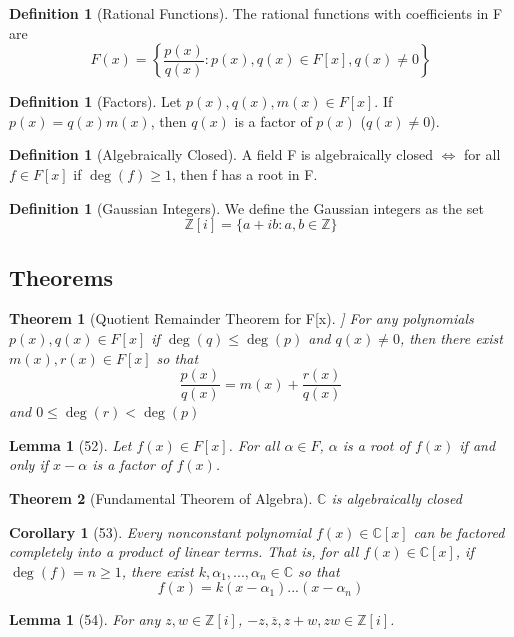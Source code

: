 \documentclass[12pt]{article}
\newtheorem*{thm*}{Theorem}
\newtheorem{lem}[thm]{Lemma}  %
\newtheorem{cor}[thm]{Corollary}
\theoremstyle{definition}
\newtheorem{defn}[thm]{Definition}
\theoremstyle{remark}
\numberwithin{equation}{section}
\newcommand\C{\mathbb C}    %
\newcommand\Z{\mathbb Z}    %
\begin{document}
\begin{defn}[Rational Functions]
        The rational functions with coefficients in F are $$F(x) = \left\{\frac{p(x)}{q(x)}:p(x),q(x) \in F[x], q(x) \neq 0\right\}$$
\end{defn}



\begin{defn}[Factors]
        Let $p(x),q(x),m(x) \in F[x]$. If $p(x) = q(x)m(x)$, then $q(x)$ is a factor of $p(x)$ ($q(x) \neq 0$).
\end{defn}


\begin{defn}[Algebraically Closed]
        A field F is algebraically closed $\iff$ for all $f \in F[x]$ if $\deg(f) \geq 1$, then f has a root in F.
\end{defn}


\begin{defn}[Gaussian Integers]
        We define the Gaussian integers as the set $$\Z[i] = \{a + ib: a,b \in \Z\}$$
\end{defn}





\subsection{Theorems}


\begin{thm*}[Quotient Remainder Theorem for F[x]]
        For any polynomials $p(x),q(x) \in F[x]$ if $\deg(q) \leq \deg(p)$ and $q(x) \neq 0$, then there exist $m(x),r(x) \in F[x]$ so that $$\frac{p(x)}{q(x)} = m(x) + \frac{r(x)}{q(x)}$$ and $0 \leq \deg(r) < \deg(p)$
\end{thm*}



\begin{lem}[52]
        Let $f(x) \in F[x]$. For all $\alpha \in F$, $\alpha$ is a root of $f(x)$ if and only if $x-\alpha$ is a factor of $f(x)$.
\end{lem}



\begin{thm*}[Fundamental Theorem of Algebra]
        $\C$ is algebraically closed
\end{thm*}



\begin{cor}[53]
        Every nonconstant polynomial $f(x) \in \C[x]$ can be factored completely into a product of linear terms. That is, for all $f(x) \in \C[x]$, if $\deg(f) = n \geq 1$, there exist $k,\alpha_1,...,\alpha_n \in \C$ so that $$f(x) = k(x - \alpha_1)...(x - \alpha_n)$$
\end{cor}


\begin{lem}[54]
        For any $z,w \in \Z[i]$, $-z,\overline{z},z+w,zw \in \Z[i]$.
\end{lem}









\end{document}

